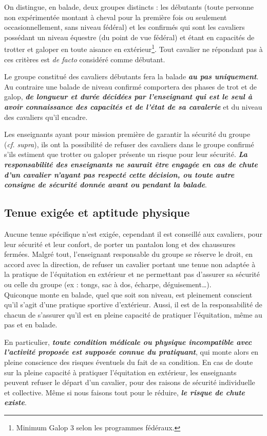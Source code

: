 \documentclass[11pt,a4paper]{article}
\renewcommand{\emph}[1]{\textit{\textbf{#1}}}
\begin{document}
      On distingue, en balade, deux groupes distincts : les \og débutants \fg{} (toute personne non expérimentée montant à cheval pour la première fois ou seulement occasionnellement, sans niveau fédéral) et les \og confirmés \fg{} qui sont les cavaliers possédant un niveau équestre (du point de vue fédéral) et étant en capacités de trotter et galoper en toute aisance en extérieur\footnote{Minimum Galop 3 selon les programmes fédéraux.}.
      Tout cavalier ne répondant pas à ces critères est \textit{de facto} considéré comme débutant.

      Le groupe constitué des cavaliers débutants fera la balade \emph{au pas uniquement}.
      Au contraire une balade de niveau confirmé comportera des phases de trot et de galop, \emph{de longueur et durée décidées par l'enseignant qui est le seul à avoir connaissance des capacités et de l'état de sa cavalerie} et du niveau des cavaliers qu'il encadre.

      Les enseignants ayant pour mission première de garantir la sécurité du groupe (\textit{cf. supra}), ils ont la possibilité de refuser des cavaliers dans le groupe confirmé s'ils estiment que trotter ou galoper présente un risque pour leur sécurité. \emph{La responsabilité des enseignants ne saurait être engagée en cas de chute d'un cavalier n'ayant pas respecté cette décision, ou toute autre consigne de sécurité donnée avant ou pendant la balade}.

   \subsection*{Tenue exigée et aptitude physique}
      Aucune tenue spécifique n'est exigée, cependant il est conseillé aux cavaliers, pour leur sécurité et leur confort, de porter un pantalon long et des chaussures fermées.
      Malgré tout, l'enseignant responsable du groupe se réserve le droit, en accord avec la direction, de refuser un cavalier portant une tenue non adaptée à la pratique de l'équitation en extérieur et ne permettant pas d'assurer sa sécurité ou celle du groupe (ex : tongs, sac à dos, écharpe, déguisement\dots).\\

      Quiconque monte en balade, quel que soit son niveau, est pleinement conscient qu'il s'agit d'une pratique sportive d'extérieur.
      Aussi, il est de la responsabilité de chacun de s'assurer qu'il est en pleine capacité de pratiquer l'équitation, même au pas et en balade.

      En particulier, \emph{toute condition médicale ou physique incompatible avec l'activité proposée est supposée connue du pratiquant}, qui monte alors en pleine conscience des risques éventuels du fait de sa condition.
      En cas de doute sur la pleine capacité à pratiquer l'équitation en extérieur, les enseignants peuvent refuser le départ d'un cavalier, pour des raisons de sécurité individuelle et collective.
      Même si nous faisons tout pour le réduire, \emph{le risque de chute existe}.
\end{document}
